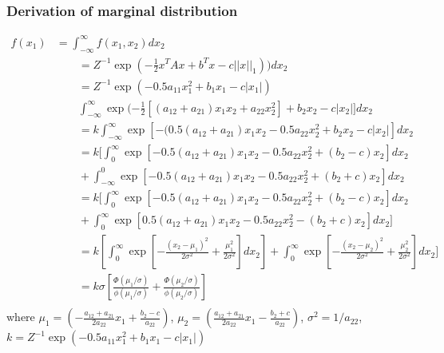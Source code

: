 \subsubsection{Derivation of marginal distribution}
$$
\begin{array}{rl}
	f(x_1)
	& =  \int_{-\infty}^{\infty} f(x_1,x_2)dx_2 \\
	& \qquad
	= Z^{-1}\exp(-\frac{1}{2}x^TAx + b^Tx - c||x||_1))dx_2 \\
	& \qquad
	= Z^{-1}\exp(-0.5a_{11}x_1^2  + b_1x_1 - c|x_1|) \\
	& \qquad
	\int_{-\infty}^{\infty}\exp(-\frac{1}{2} [(a_{12}+a_{21})x_1x_2 + a_{22}x_2^2] + b_2x_2 - c|x_2|]dx_2\\
	& \qquad
	= k \int_{-\infty}^{\infty} \exp[-(0.5(a_{12}+a_{21})x_1x_2 -0.5a_{22}x_2^2 + b_2x_2 - c|x_2|]dx_2\\
	& \qquad
	= k[ \int_{0}^{\infty} \exp[-0.5(a_{12}+a_{21})x_1x_2 - 0.5a_{22}x_2^2 + (b_2 - c)x_2 ]dx_2  \\
	& \qquad
	+\int_{-\infty}^{0} \exp[-0.5(a_{12}+a_{21})x_1x_2  - 0.5a_{22}x_2^2  + (b_2+c)x_2]dx_2 \\
	& \qquad
	= k[ \int_{0}^{\infty} \exp[-0.5(a_{12}+a_{21})x_1x_2 - 0.5a_{22}x_2^2 + (b_2 - c)x_2 ]dx_2  \\
	& \qquad
	+\int_{0}^{\infty} \exp[0.5(a_{12}+a_{21})x_1x_2  - 0.5a_{22}x_2^2  - (b_2+ c)x_2]dx_2 ]\\
	& \qquad
	= k[\int_{0}^{\infty} \exp[-\frac{(x_2-\mu_1)^2}{2\sigma^2} + \frac{\mu_1^2}{2\sigma^2}]dx_2] + \int_{0}^{\infty} \exp[-\frac{(x_2-\mu_2)^2}{2\sigma^2} + \frac{\mu_2^2}{2\sigma^2}]dx_2] \\
	& \qquad
	= k \sigma[\frac{\Phi(\mu_1/\sigma)}{\phi(\mu_1/\sigma)} +
	\frac{\Phi(\mu_2/\sigma)}{\phi(\mu_2/\sigma)}]  \\
	
\end{array}
$$
where $\mu_1 = (-\frac{a_{12}+a_{21}}{2a_{22}}x_1 + \frac{b_2-c}{a_{22}}) $, $\mu_2 =(\frac{a_{12}+a_{21}}{2a_{22}}x_1 - \frac{b_2+c}{a_{22}}) $, $\sigma^2 = 1/a_{22}$, $k =  Z^{-1}\exp(-0.5a_{11}x_1^2 + b_1x_1 - c|x_1|)$

